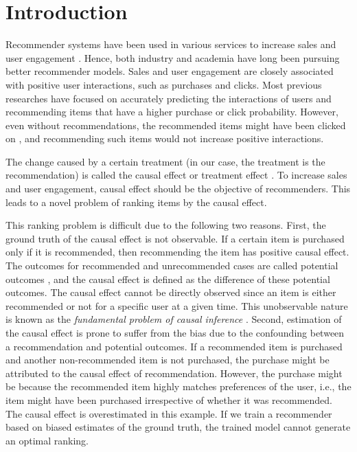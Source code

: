 \documentclass[manuscript,screen]{acmart}
\begin{document}



\maketitle

\section{Introduction}
Recommender systems have been used in various services to increase sales and user engagement \cite{Jannach19}.
Hence, both industry and academia have long been pursuing better recommender models.
Sales and user engagement are closely associated with positive user interactions, such as purchases and clicks.
Most previous researches have focused on accurately predicting the interactions of users and recommending items that have a higher purchase or click probability.
However, even without recommendations, the recommended items might have been clicked on \cite{Sharma15}, and recommending such items would not increase positive interactions.

The change caused by a certain treatment (in our case, the treatment is the recommendation) is called the causal effect or treatment effect \cite{Imbens15,Hernan20}.
To increase sales and user engagement, causal effect should be the objective of recommenders.
This leads to a novel problem of ranking items by the causal effect.

This ranking problem is difficult due to the following two reasons.
First, the ground truth of the causal effect is not observable.
If a certain item is purchased only if it is recommended, then recommending the item has positive causal effect.
The outcomes for recommended and unrecommended cases are called potential outcomes \cite{Rubin74}, and
the causal effect is defined as the difference of these potential outcomes.
The causal effect cannot be directly observed since an item is either recommended or not for a specific user at a given time.
This unobservable nature is known as the {\it fundamental problem of causal inference} \cite{Holland86}.
Second, estimation of the causal effect is prone to suffer from the bias due to the confounding between a recommendation and potential outcomes.
If a recommended item is purchased and another non-recommended item is not purchased, the purchase might be attributed to the causal effect of recommendation.
However, the purchase might be because the recommended item highly matches preferences of the user, i.e., the item might have been purchased irrespective of whether it was recommended.
The causal effect is overestimated in this example.
If we train a recommender based on biased estimates of the ground truth, the trained model cannot generate an optimal ranking.
\end{document}

